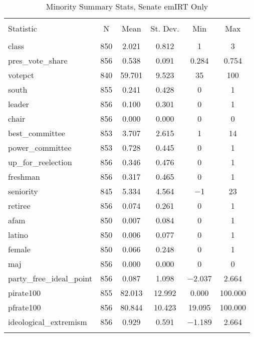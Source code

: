 \documentclass[12pt]{article}
\begin{document}
\begin{table}[!htbp] \centering 
	\caption{Minority Summary Stats, Senate emIRT Only} 
	\label{} 
\begin{tabular}{@{\extracolsep{5pt}}lccccc} 
	\\[-1.8ex]\hline 
	\hline \\[-1.8ex] 
	Statistic & \multicolumn{1}{c}{N} & \multicolumn{1}{c}{Mean} & \multicolumn{1}{c}{St. Dev.} & \multicolumn{1}{c}{Min} & \multicolumn{1}{c}{Max} \\ 
	\hline \\[-1.8ex] 
	class & 850 & 2.021 & 0.812 & 1 & 3 \\ 
	pres\_vote\_share & 856 & 0.538 & 0.091 & 0.284 & 0.754 \\ 
	votepct & 840 & 59.701 & 9.523 & 35 & 100 \\ 
	south & 855 & 0.241 & 0.428 & 0 & 1 \\ 
	leader & 856 & 0.100 & 0.301 & 0 & 1 \\ 
	chair & 856 & 0.000 & 0.000 & 0 & 0 \\ 
	best\_committee & 853 & 3.707 & 2.615 & 1 & 14 \\ 
	power\_committee & 853 & 0.728 & 0.445 & 0 & 1 \\ 
	up\_for\_reelection & 856 & 0.346 & 0.476 & 0 & 1 \\ 
	freshman & 856 & 0.317 & 0.465 & 0 & 1 \\ 
	seniority & 845 & 5.334 & 4.564 & $-$1 & 23 \\ 
	retiree & 856 & 0.074 & 0.261 & 0 & 1 \\ 
	afam & 850 & 0.007 & 0.084 & 0 & 1 \\ 
	latino & 850 & 0.006 & 0.077 & 0 & 1 \\ 
	female & 850 & 0.066 & 0.248 & 0 & 1 \\ 
	maj & 856 & 0.000 & 0.000 & 0 & 0 \\ 
	party\_free\_ideal\_point & 856 & 0.087 & 1.098 & $-$2.037 & 2.664 \\ 
	pirate100 & 855 & 82.013 & 12.992 & 0.000 & 100.000 \\ 
	pfrate100 & 856 & 80.844 & 10.423 & 19.095 & 100.000 \\ 
	ideological\_extremism & 856 & 0.929 & 0.591 & $-$1.189 & 2.664 \\ 
	\hline \\[-1.8ex] 
\end{tabular} 
\end{table}





















	
	
\end{document}
